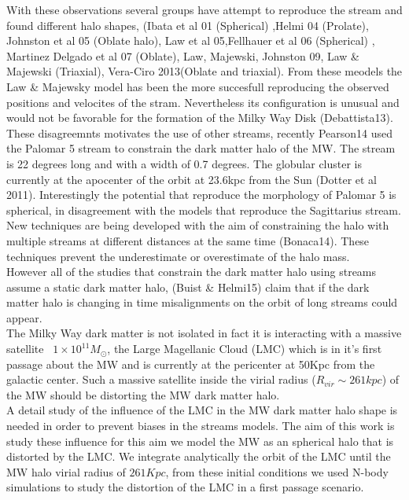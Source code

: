 With these observations several groups have attempt to reproduce the stream and found 
different halo shapes, (Ibata et al 01 (Spherical)
,Helmi 04 (Prolate), Johnston et al 05 (Oblate halo), Law et al 05,Fellhauer et al 06 (Spherical)
, Martinez Delgado et al 07 (Oblate), Law, Majewski, Johnston 09, Law \& Majewski (Triaxial),
Vera-Ciro 2013(Oblate and triaxial). From these meodels the Law \& Majewsky model has been 
the more succesfull reproducing the observed positions and velocites of the stram. Nevertheless
its configuration is unusual and would not be favorable for the formation of the Milky Way Disk
(Debattista13).\\


These disagreemnts motivates the use of other streams, 
recently Pearson14 used the Palomar 5 stream to constrain the dark 
matter halo of the MW. The stream is 22 degrees
long and with a width of 0.7 degrees. The globular cluster is currently at the 
apocenter of the orbit at 23.6kpc from the Sun (Dotter et al 2011). Interestingly
the potential that reproduce the morphology of Palomar 5 is spherical, in 
disagreement with the models that reproduce the Sagittarius stream.\\

New techniques are being developed with the aim of constraining the halo with multiple
streams at different distances at the same time (Bonaca14). These techniques 
prevent the underestimate or overestimate of the halo mass. \\

However all of the studies that constrain the dark matter halo using streams
assume a static dark matter halo, (Buist \& Helmi15) claim that if the dark matter
halo is changing in time misalignments on the orbit of long streams could appear.\\     

The Milky Way dark matter is not isolated in fact it is interacting with a 
massive satellite ~$1\times10^{11}M_{\odot}$, the Large Magellanic Cloud (LMC)
which is in it's first passage about the MW and is currently at the pericenter
at 50Kpc from the galactic center. Such a massive satellite inside the virial 
radius ($R_{vir}\sim 261kpc$) of the MW should be distorting the MW dark matter
halo. \\

A detail study of the influence of the LMC in the MW dark matter halo
shape is needed in order to prevent biases in the streams models. 
The aim of this work is study these influence for this aim 
we model the MW as an spherical halo that is distorted by the LMC. We integrate 
analytically the orbit of the LMC until the MW halo virial radius of $261Kpc$, 
from these initial conditions we used N-body simulations to study the distortion 
of the LMC in a first passage scenario.   
  

